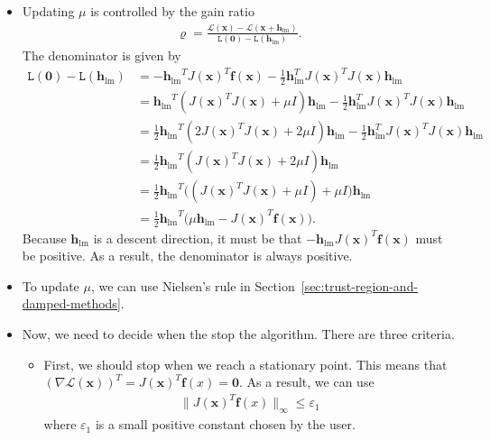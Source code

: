 \documentclass[10pt]{article}
\newcommand{\ve}[1]{\mathbf{#1}}
\newcommand{\mrm}[1]{\mathrm{#1}}
\newcommand{\mcal}[1]{\mathcal{#1}}
\begin{document}
\begin{itemize}
    \item Updating $\mu$ is controlled by the gain ratio
    \begin{align*}
        \varrho = \frac{\mathcal{L}(\ve{x}) - \mathcal{L}(\ve{x} + \ve{h}_{\mrm{lm}})}{\mathtt{L}(\ve{0}) - \mathtt{L}(\ve{h}_{\mrm{lm}})}.
    \end{align*}
    The denominator is given by
    \begin{align*}
        \mathtt{L}(\ve{0}) - \mathtt{L}(\ve{h}_{\mrm{lm}})
        &= -\ve{h_{\mrm{lm}}}^T J(\ve{x})^T \ve{f}(\ve{x}) - \frac{1}{2} \ve{h}_{\mrm{lm}}^T J(\ve{x})^T J(\ve{x}) \ve{h}_{\mrm{lm}} \\
        &= \ve{h_{\mrm{lm}}}^T (J(\ve{x})^TJ(\ve{x}) + \mu I) \ve{h}_{\mrm{lm}}  - \frac{1}{2} \ve{h}_{\mrm{lm}}^T J(\ve{x})^T J(\ve{x}) \ve{h}_{\mrm{lm}} \\
        &= \frac{1}{2} \ve{h_{\mrm{lm}}}^T (2J(\ve{x})^TJ(\ve{x}) + 2\mu I) \ve{h}_{\mrm{lm}}  - \frac{1}{2} \ve{h}_{\mrm{lm}}^T J(\ve{x})^T J(\ve{x}) \ve{h}_{\mrm{lm}} \\
        &= \frac{1}{2} \ve{h_{\mrm{lm}}}^T (J(\ve{x})^TJ(\ve{x}) + 2\mu I) \ve{h}_{\mrm{lm}} \\
        &= \frac{1}{2} \ve{h_{\mrm{lm}}}^T \big(( J(\ve{x})^TJ(\ve{x}) + \mu I)  + \mu I\big) \ve{h}_{\mrm{lm}} \\
        &= \frac{1}{2} \ve{h_{\mrm{lm}}}^T \big(\mu \ve{h}_{\mrm{lm}} - J(\ve{x})^T \ve{f}(\ve{x})).
    \end{align*}
    Because $\ve{h}_{\mrm{lm}}$ is a descent direction, it must be that $- \ve{h}_{\mrm{lm}}J(\ve{x})^T \ve{f}(\ve{x})$ must be positive. As a result, the denominator is always positive.

    \item To update $\mu$, we can use Nielsen's rule \cite{Nielsen:1999} in Section~\ref{sec:trust-region-and-damped-methods}.
    
    \item Now, we need to decide when the stop the algorithm. There are three criteria.
    \begin{itemize}
        \item First, we should stop when we reach a stationary point. This means that $(\nabla \mcal{L}(\ve{x}))^T = J(\ve{x})^T \ve{f}(x) = \ve{0}$. As a result, we can use
        \begin{align*}
            \| J(\ve{x})^T \ve{f}(x) \|_{\infty} \leq \varepsilon_1
        \end{align*}
        where $\varepsilon_1$ is a small positive constant chosen by the user.


\end{itemize}
\end{itemize}
\end{document}
